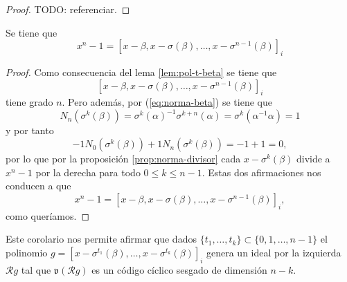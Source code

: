 \begin{proof}
  TODO: referenciar.
\end{proof}

\begin{corollary}
  Se tiene que
  \[
  x^n - 1 = \left[x - \beta, x - \sigma(\beta), \dots, x - \sigma^{n-1}(\beta)\right]_i
  \]
\end{corollary}

\begin{proof}
  Como consecuencia del lema \ref{lem:pol-t-beta} se tiene que 
  \[
    \left[x - \beta, x - \sigma(\beta), \dots, x - \sigma^{n-1}(\beta)\right]_i
  \]
  tiene grado \(n\).
  Pero además, por (\ref{eq:norma-beta}) se tiene que
  \[
  N_n(\sigma^k(\beta)) = \sigma^k(\alpha)^{-1}\sigma^{k+n}(\alpha) = \sigma^k(\alpha^{-1}\alpha) = 1
  \]
  y por tanto 
  \[
    -1N_0(\sigma^k(\beta)) + 1N_n(\sigma^k(\beta)) = -1 + 1 = 0,
  \]
  por lo que por la proposición \ref{prop:norma-divisor} cada \(x - \sigma^k(\beta)\) divide a \(x^n -1\) por la derecha para todo \(0 \leq k \leq n -1\).
  Estas dos afirmaciones nos conducen a que 
  \[
  x^n - 1 = \left[x - \beta, x - \sigma(\beta), \dots, x - \sigma^{n-1}(\beta)\right]_i,
  \]
  como queríamos. 
\end{proof}

Este corolario nos permite afirmar que dados \(\{t_1, \dots, t_k\} \subset \{0, 1, \dots, n - 1\}\) el polinomio \(g = [x - \sigma^{t_1}(\beta), \dots, x - \sigma^{t_k}(\beta)]_i\) genera un ideal por la izquierda \(\mathcal Rg\) tal que \(\mathfrak v(\mathcal Rg)\) es un código cíclico sesgado de dimensión \(n - k\).

